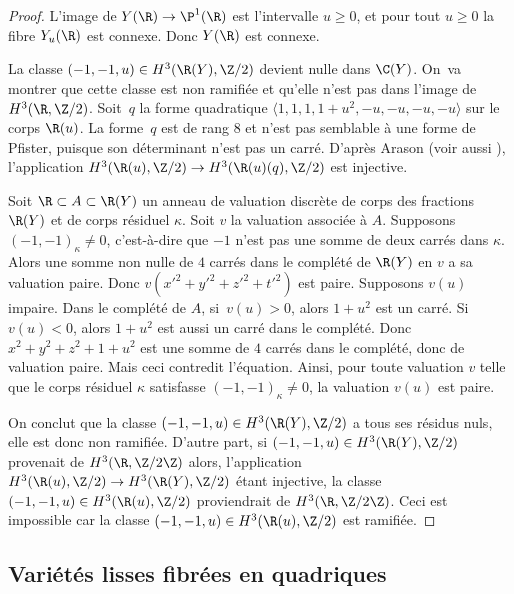 \begin{proof}
L'image de $Y(\R) \to \P^1(\R)$ est l'intervalle $u\geq 0$, et pour tout $u\geq 0$ la fibre $Y_u(\R)$ est connexe. Donc $Y(\R)$ est connexe.

La classe $(-1,-1,u)\in H^3(\R(Y),\Z/2)$ devient nulle dans $\C(Y)$. On~va montrer que cette classe est non ramifiée et qu'elle n'est pas dans l'image de $H^3(\R,\Z/2)$. Soit~$q$ la forme quadratique
$\langle 1,1,1,1+u^2, -u,-u,-u,-u\rangle$ sur le corps $\R(u)$.
La forme~$q$ est de rang $8$ et n'est pas semblable à une forme de Pfister, puisque son déterminant
n'est pas un carré. D'après Arason \cite[Satz 5.6]{arason1975cohomologische} (voir aussi \cite[Cor.\,9.6.2]{kahn2008formes}), l'application $H^3(\R(u),\Z/2) \to H^3(\R(u)(q),\Z/2)$ est injective.

Soit $\R\subset A\subset \R(Y)$ un anneau de valuation discrète
de corps des fractions $\R(Y)$ et de corps résiduel $\kappa$.
Soit $v$ la valuation associée à $A$. Supposons
$(-1,-1)_{\kappa} \neq 0$, c'est-à-dire que $-1$ n'est pas une somme de
deux carrés dans $\kappa$. Alors une somme non nulle de $4$ carrés dans
le complété de $\R(Y)$ en $v$ a sa valuation paire.
Donc $v(x'^2+y'^2+z'^2+t'^2)$ est paire.
Supposons $v(u)$ impaire. Dans le complété de $A$,
si~$v(u)>0$, alors $1+u^2$ est un carré. Si $v(u)<0$, alors
$1+u^2$ est aussi un carré dans le complété. Donc
$x^2+y^2+z^2 + 1+u^2$ est une somme de $4$ carrés dans le complété,
donc de valuation paire. Mais ceci contredit l'équation.
Ainsi, pour toute valuation $v$ telle que le corps résiduel $\kappa$
satisfasse $(-1,-1)_{\kappa} \neq 0$, la valuation $v(u)$ est paire.

On conclut que la classe $(-1,-1,u) \in H^3(\R(Y),\Z/2)$ a tous ses résidus nuls,
elle est donc non ramifiée. D'autre part, si $(-1,-1,u) \in H^3(\R(Y),\Z/2)$ provenait de $H^3(\R,\Z/2\Z)$ alors, l'application $H^3(\R(u),\Z/2)\to H^3(\R(Y),\Z/2)$ étant injective, la classe $(-1,-1,u) \in H^3(\R(u),\Z/2)$ proviendrait de $H^3(\R,\Z/2\Z)$. Ceci est impossible car la classe $(-1,-1,u) \in H^3(\R(u),\Z/2)$ est ramifiée.
\end{proof}

\subsection{Variétés lisses fibrées en quadriques}


